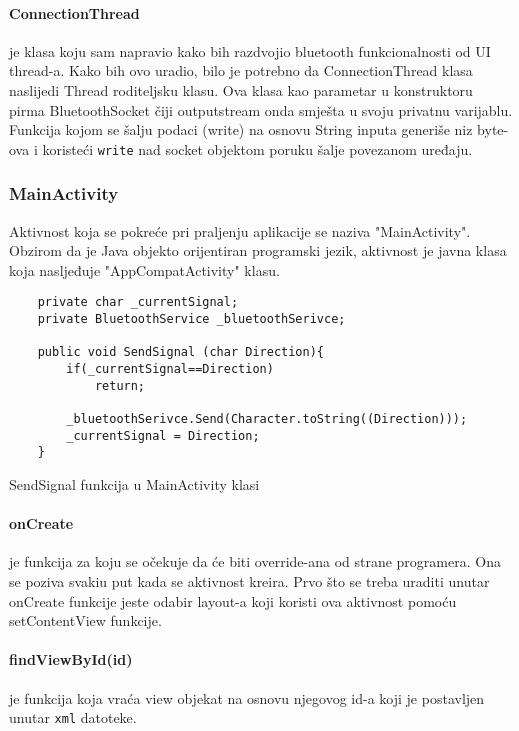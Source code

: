\documentclass[../Document.tex]{subfiles}
\begin{document}
\paragraph{ConnectionThread} je klasa koju sam napravio kako bih razdvojio bluetooth funkcionalnosti od UI thread-a. Kako bih ovo uradio, bilo je potrebno da ConnectionThread klasa naslijedi Thread roditeljsku klasu. Ova klasa kao parametar u konstruktoru pirma BluetoothSocket čiji outputstream onda smješta u svoju privatnu varijablu. Funkcija kojom se šalju podaci (write) na osnovu String inputa generiše niz byte-ova i koristeći \verb|write| nad socket objektom poruku šalje povezanom uređaju.

\subsubsection{MainActivity}
Aktivnost koja se pokreće pri praljenju aplikacije se naziva "MainActivity". Obzirom da je Java objekto orijentiran programski jezik, aktivnost je javna klasa koja nasljeđuje "AppCompatActivity" klasu.

\begin{code}
    \begin{verbatim}
    private char _currentSignal;
    private BluetoothService _bluetoothSerivce;
    
    public void SendSignal (char Direction){
        if(_currentSignal==Direction)
            return;
    
        _bluetoothSerivce.Send(Character.toString((Direction)));
        _currentSignal = Direction;
    }
    \end{verbatim}
    \caption{SendSignal funkcija u MainActivity klasi}
\end{code}

\paragraph{onCreate} je funkcija za koju se očekuje da će biti override-ana od strane programera. Ona se poziva svakiu put kada se aktivnost kreira. Prvo što se treba uraditi unutar onCreate funkcije jeste odabir layout-a koji koristi ova aktivnost pomoću setContentView funkcije.

\paragraph{findViewById(id)} je funkcija koja vraća view objekat na osnovu njegovog id-a koji je postavljen unutar \verb|xml| datoteke.
\end{document}
